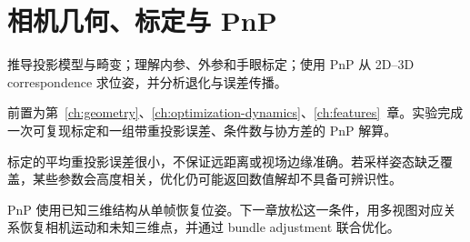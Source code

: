 \chapter{相机几何、标定与 PnP}
\label{ch:camera-pnp}

\begin{learningobjectives}
推导投影模型与畸变；理解内参、外参和手眼标定；使用 PnP 从 2D--3D correspondence 求位姿，并分析退化与误差传播。
\end{learningobjectives}

\begin{prerequisites}
前置为第~\ref{ch:geometry}、\ref{ch:optimization-dynamics}、\ref{ch:features}~章。实验完成一次可复现标定和一组带重投影误差、条件数与协方差的 PnP 解算。
\end{prerequisites}


\begin{failuremode}
标定的平均重投影误差很小，不保证远距离或视场边缘准确。若采样姿态缺乏覆盖，某些参数会高度相关，优化仍可能返回数值解却不具备可辨识性。
\end{failuremode}

\begin{chaptertransition}
PnP 使用已知三维结构从单帧恢复位姿。下一章放松这一条件，用多视图对应关系恢复相机运动和未知三维点，并通过 bundle adjustment 联合优化。
\end{chaptertransition}

